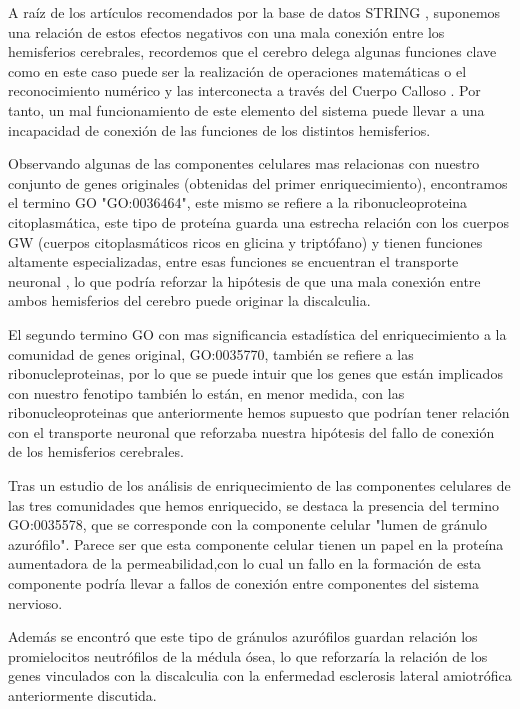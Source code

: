 A raíz de los artículos recomendados por la base de datos STRING \cite{Walterfang2014,frontotemporal}, suponemos una relación de estos efectos negativos con una mala conexión entre los hemisferios cerebrales, recordemos que el cerebro delega algunas funciones clave como en este caso puede ser la realización de operaciones matemáticas o el reconocimiento numérico y las interconecta a través del Cuerpo Calloso \cite{CorpusCallosum}. Por tanto, un mal funcionamiento de este elemento del sistema puede llevar a una incapacidad de conexión de las funciones de los distintos hemisferios.

\hfill

Observando algunas de las componentes celulares mas relacionas con nuestro conjunto de genes originales (obtenidas del primer enriquecimiento),
encontramos el termino GO "GO:0036464", este mismo se refiere a la ribonucleoproteina citoplasmática, este tipo de proteína guarda una estrecha relación con los cuerpos GW (cuerpos citoplasmáticos ricos en glicina y triptófano) y tienen funciones altamente especializadas, entre esas funciones se encuentran el transporte neuronal \cite{CytoplasmicRibo}, lo que podría reforzar la hipótesis de que una mala conexión entre ambos hemisferios del cerebro puede originar la discalculia.

\newpage

El segundo termino GO con mas significancia estadística del enriquecimiento a la comunidad de genes original, GO:0035770, también se refiere a las ribonucleproteinas, por lo que se puede intuir que los genes que están implicados con nuestro fenotipo también lo están, en menor medida, con las ribonucleoproteinas que anteriormente hemos supuesto que podrían tener relación con el transporte neuronal\cite{CytoplasmicRibo} que reforzaba nuestra hipótesis del fallo de conexión de los hemisferios cerebrales.

\hfill 

Tras un estudio de los análisis de enriquecimiento de las componentes celulares de las tres comunidades que hemos enriquecido, se destaca la presencia del termino GO:0035578, que se corresponde con la componente celular "lumen de gránulo azurófilo". Parece ser que esta componente celular tienen un papel en la proteína aumentadora de la permeabilidad\cite{Azurophil},con lo cual un fallo en la formación de esta componente podría llevar a fallos de conexión entre componentes del sistema nervioso.

\hfill

Además se encontró que este tipo de gránulos azurófilos guardan relación los promielocitos neutrófilos de la médula ósea\cite{Azurophil}, lo que reforzaría la relación de los genes vinculados con la discalculia con la enfermedad  esclerosis lateral amiotrófica anteriormente discutida.